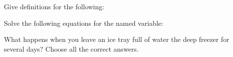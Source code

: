 \documentclass[11pt,addpoints]{exam}   	%
\begin{document}
\begin{questions}
\question
Give definitions for the following:

\question
Solve the following equations for the named variable:


\question[5]
What happens when you leave an ice tray full of water the deep freezer for several days?
Choose all the correct answers.


\end{questions}
\end{document}
